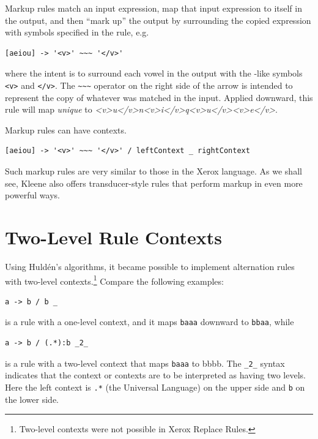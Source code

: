 Markup rules match an input expression, map that input expression to itself in the output, and then ``mark up'' the
output by surrounding the copied expression with symbols specified in the rule, e.g.

\begin{Verbatim}
[aeiou] -> '<v>' ~~~ '</v>'
\end{Verbatim}

\noindent
where the intent is to surround each vowel in the output with the
-like symbols \verb!<v>! and \verb!</v>!.  The \verb!~~~!
operator on the right side of the arrow is intended to represent the copy
of whatever was matched in the input.  Applied downward,
this rule will map \emph{unique} to \emph{<v>u</v>n<v>i</v>q<v>u</v><v>e</v>}.

Markup rules can have contexts.

\begin{Verbatim}
[aeiou] -> '<v>' ~~~ '</v>' / leftContext _ rightContext
\end{Verbatim}

Such markup rules are very similar to those in the Xerox \xfst{} language.  As we shall see, Kleene also offers transducer-style rules that perform
markup in even more powerful ways.

\section{Two-Level Rule Contexts}

Using Huld\'en's algorithms, it became possible to implement alternation rules with two-level contexts.\footnote{Two-level contexts
were not possible in Xerox Replace Rules.}
Compare the following examples:

\begin{Verbatim}
a -> b / b _
\end{Verbatim}

\noindent
is a rule with a one-level context, and it maps \texttt{baaa} downward to \texttt{bbaa}, while

\begin{Verbatim}
a -> b / (.*):b _2_
\end{Verbatim}

\noindent
is a rule with a two-level context that maps \texttt{baaa} to {bbbb}.  The
\verb!_2_! syntax indicates that the context or contexts are to be interpreted as
having two levels.  Here the left context is \verb!.*! (the Universal Language) on the upper side and \verb!b! on the
lower side.

